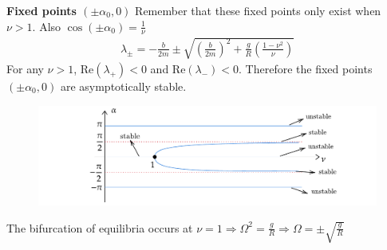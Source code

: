 \begin{solution}[3.2]
\begin{enumerate}
\textbf{Fixed points $(\pm \alpha_0,0)$}
Remember that these fixed points only exist when $\nu > 1$. Also $\cos(\pm \alpha_0) = \frac{1}{\nu}$
\begin{align}
	\lambda_\pm = -\frac{b}{2m} \pm \sqrt{\left(\frac{b}{2m}\right)^2 + \frac{g}{R}\left( \frac{1-\nu^2}{\nu} \right)}
\end{align}
For any $\nu > 1$, Re$(\lambda_+)<0$ and Re$(\lambda_-)<0$. Therefore the fixed points $(\pm \alpha_0,0)$ are asymptotically stable. 

\begin{figure}[h]
	\centering
	\includegraphics[scale=0.9]{figures/solutions/ch3/S01D02.pdf}
\end{figure}

The bifurcation of equilibria occurs at $\nu = 1 \Longrightarrow \Omega^2 = \frac{g}{R} \Longrightarrow \Omega = \pm \sqrt{\frac{g}{R}}$
\end{enumerate}
\end{solution}

